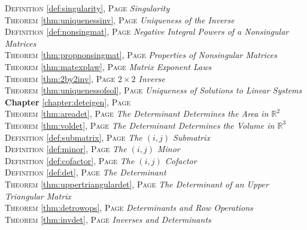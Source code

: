 \begin{multicols}{2}
{\textsc{Definition} \ref{def:singularity}, \textsc{Page} \pageref{def:singularity} \textit{Singularity} \\
\textsc{Theorem} \ref{thm:uniquenessinv}, \textsc{Page} \pageref{thm:uniquenessinv} \textit{Uniqueness of the Inverse} \\
\textsc{Definition} \ref{def:nonsingmat}, \textsc{Page} \pageref{def:nonsingmat} \textit{Negative Integral Powers of a Nonsingular Matrices} \\
\textsc{Theorem} \ref{thm:propnonsingmat}, \textsc{Page} \pageref{thm:propnonsingmat} \textit{Properties of Nonsingular Matrices} \\
\textsc{Theorem} \ref{thm:matexplaw}, \textsc{Page} \pageref{thm:matexplaw} \textit{Matrix Exponent Laws} \\
\textsc{Theorem} \ref{thm:2by2inv}, \textsc{Page} \pageref{thm:2by2inv} \textit{\(2\times 2\) Inverse} \\
\textsc{Theorem} \ref{thm:uniquenessofsol}, \textsc{Page} \pageref{thm:uniquenessofsol} \textit{Uniqueness of Solutions to Linear Systems} \\
\textbf{Chapter} \ref{chapter:deteigen}, \textsc{Page} \pageref{chapter:deteigen} \\
\textsc{Theorem} \ref{thm:areadet}, \textsc{Page} \pageref{thm:areadet} \textit{The Determinant Determines the Area in \(\mathbb {R}^2\)} \\
\textsc{Theorem} \ref{thm:voldet}, \textsc{Page} \pageref{thm:voldet} \textit{The Determinant Determines the Volume in \(\mathbb {R}^3\)} \\
\textsc{Definition} \ref{def:submatrix}, \textsc{Page} \pageref{def:submatrix} \textit{The \((i,j)\) Submatrix} \\
\textsc{Definition} \ref{def:minor}, \textsc{Page} \pageref{def:minor} \textit{The \((i,j)\) Minor} \\
\textsc{Definition} \ref{def:cofactor}, \textsc{Page} \pageref{def:cofactor} \textit{The \((i,j)\) Cofactor} \\
\textsc{Definition} \ref{def:det}, \textsc{Page} \pageref{def:det} \textit{The Determinant} \\
\textsc{Theorem} \ref{thm:uppertriangulardet}, \textsc{Page} \pageref{thm:uppertriangulardet} \textit{The Determinant of an Upper Triangular Matrix} \\
\textsc{Theorem} \ref{thm:detrowops}, \textsc{Page} \pageref{thm:detrowops} \textit{Determinants and Row Operations} \\
\textsc{Theorem} \ref{thm:invdet}, \textsc{Page} \pageref{thm:invdet} \textit{Inverses and Determinants} \\
}
\end{multicols}
